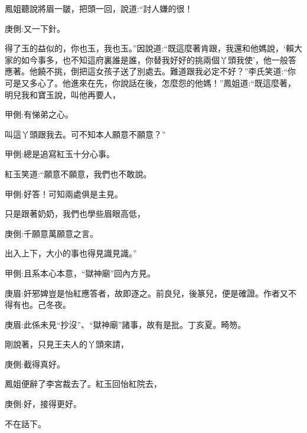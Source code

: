 \begin{parag}
    鳳姐聽說將眉一皺，把頭一回，說道:“討人嫌的很！\begin{note}庚側:又一下針。\end{note}得了玉的益似的，你也玉，我也玉。”因說道:“既這麼著肯跟，我還和他媽說，‘賴大家的如今事多，也不知這府裏誰是誰，你替我好好的挑兩個丫頭我使’，他一般答應著。他饒不挑，倒把這女孩子送了別處去。難道跟我必定不好？”李氏笑道:“你可是又多心了。他進來在先，你說話在後，怎麼怨的他媽！”鳳姐道:“既這麼著，明兒我和寶玉說，叫他再要人，\begin{note}甲側:有悌弟之心。\end{note}叫這丫頭跟我去。可不知本人願意不願意？”\begin{note}甲側:總是追寫紅玉十分心事。\end{note}紅玉笑道:“願意不願意，我們也不敢說。\begin{note}甲側:好答！可知兩處俱是主見。\end{note}只是跟著奶奶，我們也學些眉眼高低，\begin{note}庚側:千願意萬願意之言。\end{note}出入上下，大小的事也得見識見識。”\begin{note}甲側:且系本心本意，“獄神廟”回內方見。\end{note}\begin{note}庚眉:奸邪婢豈是怡紅應答者，故即逐之。前良兒，後篆兒，便是確證。作者又不得有也。己冬夜。\end{note}\begin{note}庚眉:此係未見“抄沒”、“獄神廟”諸事，故有是批。丁亥夏。畸笏。\end{note}剛說著，只見王夫人的丫頭來請，\begin{note}庚側:截得真好。\end{note}鳳姐便辭了李宮裁去了。紅玉回怡紅院去，\begin{note}庚側:好，接得更好。\end{note}不在話下。
\end{parag}



